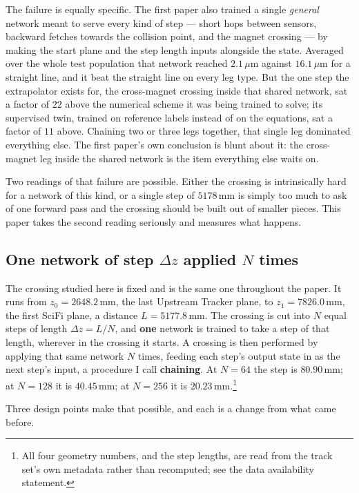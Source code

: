 \documentclass[11pt,a4paper]{article}
\newcommand{\um}{\ensuremath{\,\mu\mathrm{m}}}
\newcommand{\mm}{\ensuremath{\,\mathrm{mm}}}
\begin{document}
The failure is equally specific. The first paper also trained a single
\emph{general} network meant to serve every kind of step --- short hops between
sensors, backward fetches towards the collision point, and the magnet crossing
--- by making the start plane and the step length inputs alongside the state.
Averaged over the whole test population that network reached $2.1\um$ against
$16.1\um$ for a straight line, and it beat the straight line on every leg type.
But the one step the extrapolator exists for, the cross-magnet crossing inside
that shared network, sat a factor of $22$ above the numerical scheme it was
being trained to solve; its supervised twin, trained on reference labels
instead of on the equations, sat a factor of $11$ above. Chaining two or three
legs together, that single leg dominated everything else. The first paper's own
conclusion is blunt about it: the cross-magnet leg inside the shared network
is the item everything else waits on.

Two readings of that failure are possible. Either the crossing is intrinsically
hard for a network of this kind, or a single step of $5178\mm$ is simply too
much to ask of one forward pass and the crossing should be built out of
smaller pieces. This paper takes the second reading seriously and measures what
happens.

\subsection{One network of step \texorpdfstring{$\Delta z$}{Delta z} applied \texorpdfstring{$N$}{N} times}
\label{sec:intro-selfchain}

The crossing studied here is fixed and is the same one throughout the paper. It
runs from $z_0 = 2648.2\mm$, the last Upstream Tracker plane, to
$z_1 = 7826.0\mm$, the first SciFi plane, a distance $L = 5177.8\mm$. The
crossing is cut into $N$ equal steps of length $\Delta z = L/N$, and
\textbf{one} network is trained to take a step of that length, wherever in the
crossing it starts. A crossing is then performed by applying that same network
$N$ times, feeding each step's output state in as the next step's input, a
procedure I call \textbf{chaining}. At $N = 64$ the step is $80.90\mm$; at
$N = 128$ it is $40.45\mm$; at $N = 256$ it is $20.23\mm$.\footnote{All four
geometry numbers, and the step lengths, are read from the track set's own
metadata rather than recomputed; see the data availability statement.}

Three design points make that possible, and each is a change from what came
before.
\end{document}
